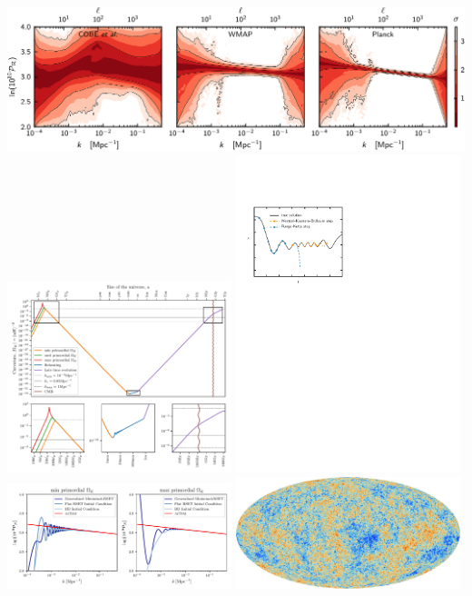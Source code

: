 \documentclass[aspectratio=169]{beamer}
\begin{document}
\begin{frame}
\begin{columns}
        \includegraphics[width=\textwidth]{figures/pps}
        \includegraphics[width=0.49\textwidth]{figures/phi4o3}
        \includegraphics[width=0.49\textwidth]{figures/oscode}
        \includegraphics[width=0.49\textwidth]{figures/R-RST-flat-BD.pdf}
        \includegraphics[width=0.49\textwidth]{figures/CMB.png}
    \end{columns}


\end{frame}
\end{document}
